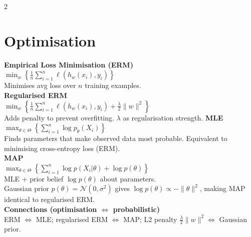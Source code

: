 \documentclass[10pt]{article}
\begin{document}
\begin{multicols*}{2}
\section*{Optimisation}
\textbf{Empirical Loss Minimisation (ERM)}\\
$\min_w \left\{ \frac{1}{n} \sum_{i=1}^{n} \ell(h_w(x_i), y_i) \right\}$\\
Minimises avg loss over $n$ training examples.\\
\textbf{Regularised ERM}\\
$\min_w \left\{ \frac{1}{n} \sum_{i=1}^{n} \ell(h_w(x_i), y_i) + \frac{\lambda}{2}\|w\|^2 \right\}$\\
Adds penalty to prevent overfitting. $\lambda$ as regularisation strength.
\textbf{MLE}\\
$\max_{\theta \in \Theta} \left\{ \sum_{i=1}^{n} \log p_\theta(X_i) \right\}$\\
Finds parameters that make observed data most probable. Equivalent to minimising cross-entropy loss (ERM).\\
\textbf{MAP}\\
$\max_{\theta \in \Theta} \left\{ \sum_{i=1}^{n} \log p(X_i|\theta) + \log p(\theta) \right\}$\\
MLE + prior belief $\log p(\theta)$ about parameters.\\
Gaussian prior $p(\theta) = \mathcal{N}(0,\sigma^2)$ gives $\log p(\theta) \propto -\|\theta\|^2$, making MAP identical to regularised ERM.\\
\textbf{Connections (optimisation $\iff$ probabilistic)}\\
ERM $\iff$ MLE; regularised ERM $\iff$ MAP; L2 penalty $\frac{\lambda}{2}\|w\|^2 \iff$ Gaussian prior.\\[1\baselineskip]


\end{multicols*}
\end{document}
